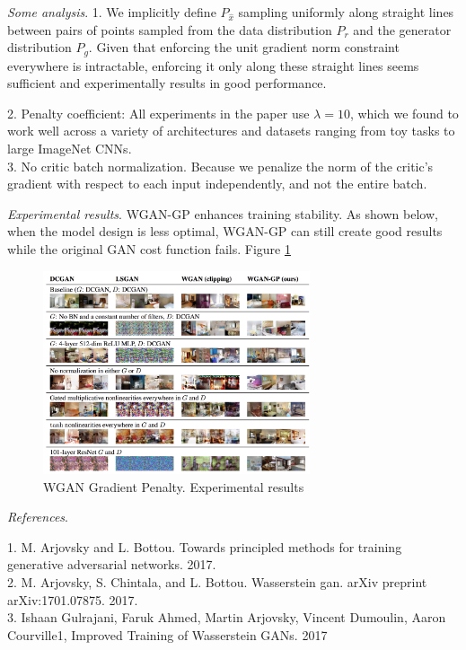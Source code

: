 \documentclass[english]{article}
\begin{document}
\item {\emph{Some analysis}}.
1. We implicitly define $P_{\hat{x}}$ sampling uniformly along straight lines between
pairs of points sampled from the data distribution $P_r$ and the generator distribution $P_g$. Given that enforcing the unit gradient norm constraint everywhere is intractable, enforcing it only along these straight lines seems sufficient and experimentally results in good performance.

2. Penalty coefficient: All experiments in the paper use $\lambda=10$, which we found to work well across a variety of architectures and datasets ranging from toy tasks to large ImageNet CNNs.\\
3. No critic batch normalization. Because we penalize the norm of the critic’s gradient with respect to each input independently, and not the entire batch. 





\item {\emph{Experimental results}}.
WGAN-GP enhances training stability. As shown below, when the model design is less optimal, WGAN-GP can still create good results while the original GAN cost function fails. Figure \ref{wgan_gp_exp}

\begin{figure}[h!]
  \centering
  \includegraphics[width=0.7\textwidth]{experiment.png}
    \caption{WGAN Gradient Penalty. Experimental results}
  \label{wgan_gp_exp}
 \end{figure}

\item {\emph{References}}.

1. M. Arjovsky and L. Bottou. Towards principled methods for training generative adversarial networks. 2017.\\
2. M. Arjovsky, S. Chintala, and L. Bottou. Wasserstein gan. arXiv preprint arXiv:1701.07875. 2017.\\
3. Ishaan Gulrajani, Faruk Ahmed, Martin Arjovsky, Vincent Dumoulin, Aaron Courville1, Improved Training of Wasserstein GANs. 2017\\
\end{document}
